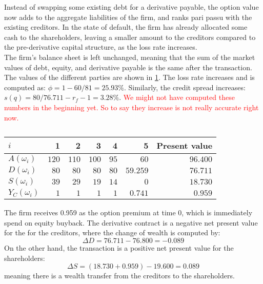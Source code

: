 \documentclass[../main.tex]{subfiles}
\begin{document}
            Instead of swapping some existing debt for a derivative payable, the option value now adds to the aggregate liabilities of the firm, and ranks pari passu with the existing creditors. In the state of default, the firm has already allocated some cash to the shareholders, leaving a smaller amount to the creditors compared to the pre-derivative capital structure, as the loss rate increases.\\
            The firm's balance sheet is left unchanged, meaning that the sum of the market values of debt, equity, and derivative payable is the same after the transaction. The values of the different parties are shown in \cref{tbl:example-equity-buyback}. The loss rate increases and is computed as: $\phi = 1 - 60/81 = 25.93\%$. Similarly, the credit spread increases: $s(q) = 80/76.711 - r_f - 1 = 3.28\%$. \textcolor{red}{We might not have computed these numbers in the beginning yet. So to say they increase is not really accurate right now.}

            \begin{table}[h]
                \centering
                \begin{tabular}{l|rrrrr||r}
                    $i$ & 1 & 2 & 3 & 4 & 5 & Present value \\
                    \hline
                    $A(\omega_{i})$ & $120$ & $110$ & $100$ & $95$ & $60$ & $96.400$ \\
                    $D(\omega_{i})$ & $80$ & $80$ & $80$ & $80$ & $59.259$ & $76.711$ \\
                    $S(\omega_{i})$ & $39$ & $29$ & $19$ & $14$ & $0$ & $18.730$ \\
                    $Y_C(\omega_{i})$ & $1$ & $1$ & $1$ & $1$ & $0.741$ & $0.959$ \\
                \end{tabular}
                \caption{}
                \label{tbl:example-equity-buyback}
            \end{table}

            The firm receives 0.959 as the option premium at time 0, which is immediately spend on equity buyback. The derivative contract is a negative net present value for the for the creditors, where the change of wealth is computed by:
            \begin{equation}
                \Delta D = 76.711 - 76.800 = -0.089
            \end{equation}
            On the other hand, the transaction is a positive net present value for the shareholders:
            \begin{equation}
                \Delta S = (18.730 + 0.959) - 19.600 = 0.089
            \end{equation}
            meaning there is a wealth transfer from the creditors to the shareholders.
\end{document}
